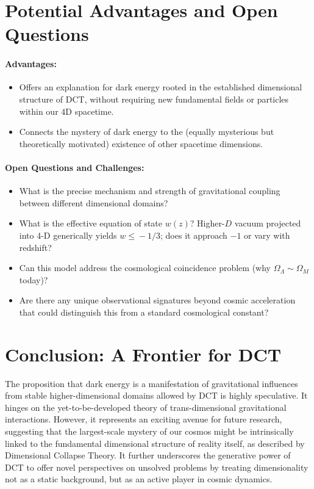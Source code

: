\documentclass[a4paper, 12pt, oneside]{book}
\numberwithin{equation}{chapter}
\begin{document}
\section[Open Questions]{Potential Advantages and Open Questions}
\label{sec:DEAdvantagesQuestions}
\paragraph{Advantages:}
\begin{itemize}
    \item Offers an explanation for dark energy rooted in the established dimensional structure of DCT, without requiring new fundamental fields or particles within our 4D spacetime.
    \item Connects the mystery of dark energy to the (equally mysterious but theoretically motivated) existence of other spacetime dimensions.
\end{itemize}
\paragraph{Open Questions and Challenges:}
\begin{itemize}
    \item What is the precise mechanism and strength of gravitational coupling between different dimensional domains?
    \item What is the effective equation of state $w(z)$?  Higher-$D$ vacuum projected into 4-D generically yields $w\!\le\!-1/3$; does it approach $-1$ or vary with redshift?
    \item Can this model address the cosmological coincidence problem (why $\Omega_{\Lambda} \sim \Omega_{M}$ today)?
    \item Are there any unique observational signatures beyond cosmic acceleration that could distinguish this from a standard cosmological constant?
\end{itemize}

\section{Conclusion: A Frontier for DCT}
\label{sec:DEConclusion}
The proposition that dark energy is a manifestation of gravitational influences from stable higher-dimensional domains allowed by DCT is highly speculative. It hinges on the yet-to-be-developed theory of trans-dimensional gravitational interactions. However, it represents an exciting avenue for future research, suggesting that the largest-scale mystery of our cosmos might be intrinsically linked to the fundamental dimensional structure of reality itself, as described by Dimensional Collapse Theory. It further underscores the generative power of DCT to offer novel perspectives on unsolved problems by treating dimensionality not as a static background, but as an active player in cosmic dynamics.


\mainmatter



\end{document}
